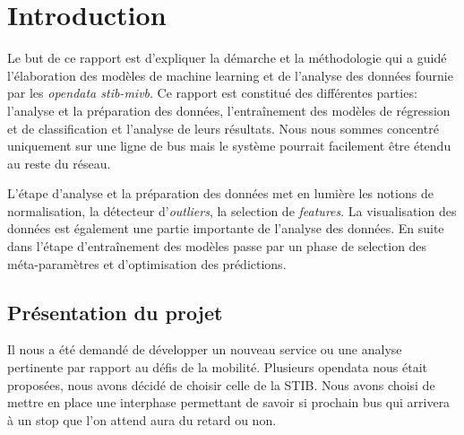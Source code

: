 \chapter{Introduction}
Le but de ce rapport est d'expliquer la démarche et la méthodologie qui a guidé l'élaboration des modèles de machine learning et de l'analyse des données fournie par les \textit{opendata stib-mivb}. Ce rapport est constitué des différentes parties: l'analyse et la préparation des données, l'entraînement des modèles de régression et de classification et l'analyse de leurs résultats. Nous nous sommes concentré uniquement sur une ligne de bus mais le système pourrait facilement être étendu au reste du réseau.

L'étape d'analyse et la préparation des données met en lumière les notions de normalisation, la détecteur d'\textit{outliers}, la selection de \textit{features}. La visualisation des données est également une partie importante de l'analyse des données. En suite dans l'étape d'entraînement des modèles passe par un phase de selection des méta-paramètres et d'optimisation des prédictions.

\section{Présentation du projet}
Il nous a été demandé de développer un nouveau service ou une analyse pertinente par rapport au défis de la mobilité. Plusieurs opendata nous était proposées, nous avons décidé de choisir celle de la STIB. Nous avons choisi de mettre en place une interphase permettant de savoir si prochain bus qui arrivera à un stop que l'on attend aura du retard ou non.
